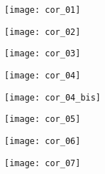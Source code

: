\question{}
\begin{center}
\texttt{[image: cor\_01]}
\end{center}

\question{}
\begin{center}
\texttt{[image: cor\_02]}
\end{center}

\question{}
\begin{center}
\texttt{[image: cor\_03]}
\end{center}

\question{}
\begin{center}
\texttt{[image: cor\_04]}

\texttt{[image: cor\_04\_bis]}
\end{center}

\question{}
\begin{center}
\texttt{[image: cor\_05]}
\end{center}

\question{}
\begin{center}
\texttt{[image: cor\_06]}
\end{center}

\question{}
\begin{center}
\texttt{[image: cor\_07]}
\end{center}
%
%
%
%

\else
\fi
